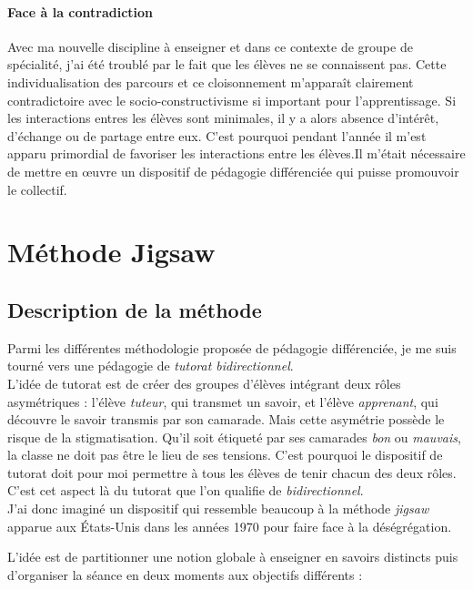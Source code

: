 \paragraph{Face à la contradiction}
%
Avec ma nouvelle discipline à enseigner et dans ce contexte de groupe de spécialité, j'ai été troublé par le fait que les élèves ne se connaissent pas. Cette individualisation des parcours et ce cloisonnement m'apparaît clairement contradictoire avec le socio-constructivisme si important pour l'apprentissage. Si les interactions entres les élèves sont minimales, il y a alors absence d'intérêt, d'échange ou de partage entre eux.
%
C'est pourquoi pendant l'année il m'est apparu primordial de favoriser les interactions entre les élèves.Il m'était nécessaire de mettre en œuvre un dispositif de pédagogie différenciée qui puisse promouvoir le collectif.



\section{Méthode Jigsaw}

\subsection{Description de la méthode}


Parmi les différentes méthodologie proposée de pédagogie différenciée, je me suis tourné vers une pédagogie de \emph{tutorat bidirectionnel}. 
\\
L'idée de tutorat est de créer des groupes d'élèves intégrant deux rôles asymétriques : l'élève \emph{tuteur}, qui transmet un savoir, et l'élève \emph{apprenant}, qui découvre le savoir transmis par son camarade.
% 
Mais cette asymétrie possède le risque de la stigmatisation. Qu'il soit étiqueté par ses camarades \emph{bon} ou \emph{mauvais}, la classe ne doit pas être le lieu de ses tensions. C'est pourquoi le dispositif de tutorat doit pour moi permettre à tous les élèves de tenir chacun des deux rôles. C'est cet aspect là du tutorat que l'on qualifie de \emph{bidirectionnel}.
\\
J'ai donc imaginé un dispositif qui ressemble beaucoup à la méthode \emph{jigsaw} apparue aux États-Unis dans les années 1970 pour faire face à la déségrégation.

L'idée est de partitionner une notion globale à enseigner en savoirs distincts puis d'organiser la séance en deux moments aux objectifs différents :

